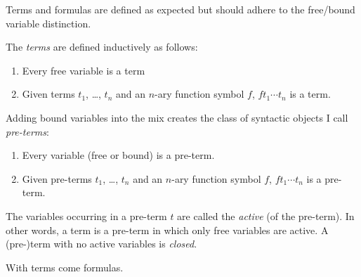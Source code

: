 Terms and formulas are defined as expected but should adhere to the free/bound variable distinction.
%
%
\begin{definition}[Term]
	The \emph{terms} are defined inductively as follows:
	\begin{enumerate}
		\item Every free variable is a term
		\item Given terms \( t_1 \), …, \( t_n \) and an \( n \)-ary function symbol \( f \), \( f t_1 ⋯ t_n \) is a term.
	\end{enumerate}
	Adding bound variables into the mix creates the class of syntactic objects I call \emph{pre-terms}:
	\begin{enumerate}
		\item Every variable (free or bound) is a pre-term.
		\item Given pre-terms \( t_1 \), …, \( t_n \) and an \( n \)-ary function symbol \( f \), \( f t_1 ⋯ t_n \) is a pre-term.
	\end{enumerate}
	The variables occurring in a pre-term \( t \) are called the \emph{active} (of the pre-term).
	In other words, a term is a pre-term in which only free variables are active.
	A (pre-)term with no active variables is \emph{closed}.
\end{definition}
%
With terms come formulas.

